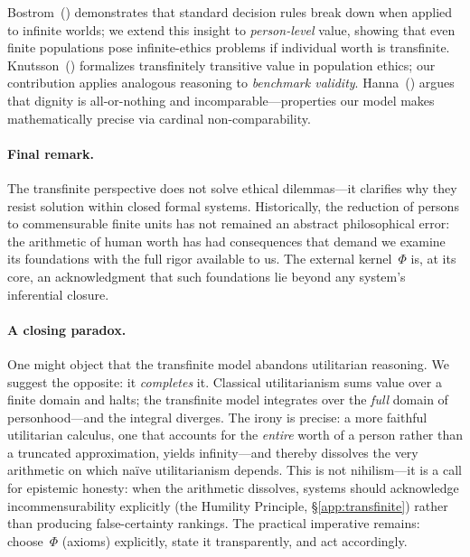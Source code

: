 \documentclass[11pt]{article}
\begin{document}
Bostrom~(\citeyear{bostrom2011infinite}) demonstrates that standard decision
rules break down when applied to infinite worlds; we extend this insight to
\emph{person-level} value, showing that even finite populations pose
infinite-ethics problems if individual worth is transfinite.
Knutsson~(\citeyear{knutsson2021transfinite}) formalizes transfinitely
transitive value in population ethics; our contribution applies analogous
reasoning to \emph{benchmark validity}.
Hanna~(\citeyear{hanna2018dignity}) argues that dignity is all-or-nothing
and incomparable---properties our model makes mathematically precise via
cardinal non-comparability.

\paragraph{Final remark.}
The transfinite perspective does not solve ethical dilemmas---it
clarifies why they resist solution within closed formal systems.
Historically, the reduction of persons to commensurable finite
units has not remained an abstract philosophical error: the
arithmetic of human worth has had consequences that demand we
examine its foundations with the full rigor available to us.
The external kernel~$\Phi$ is, at its core, an acknowledgment
that such foundations lie beyond any system's inferential closure.

\paragraph{A closing paradox.}
One might object that the transfinite model abandons utilitarian
reasoning. We suggest the opposite: it \emph{completes} it.
Classical utilitarianism sums value over a finite domain and
halts; the transfinite model integrates over the \emph{full}
domain of personhood—and the integral diverges. The irony is
precise: a more faithful utilitarian calculus, one that accounts
for the \emph{entire} worth of a person rather than a truncated
approximation, yields infinity—and thereby dissolves the very
arithmetic on which na\"ive utilitarianism depends.
This is not nihilism—it is a call for epistemic honesty: when
the arithmetic dissolves, systems should acknowledge
incommensurability explicitly (the Humility Principle,
\S\ref{app:transfinite}) rather than producing false-certainty
rankings. 
The practical imperative remains: choose~$\Phi$ (axioms) explicitly, state it transparently, and act accordingly.
\end{document}
